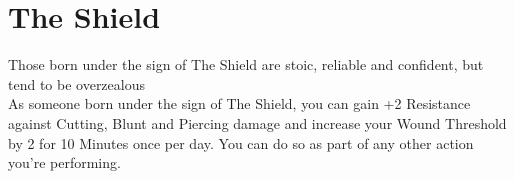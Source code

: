 \section{The Shield}

Those born under the sign of The Shield are stoic, reliable and confident, but tend to be overzealous\\
As someone born under the sign of The Shield, you can gain +2 Resistance against Cutting, Blunt and Piercing damage and increase your Wound Threshold by 2 for 10 Minutes once per day. You can do so as part of any other action you're performing.\\